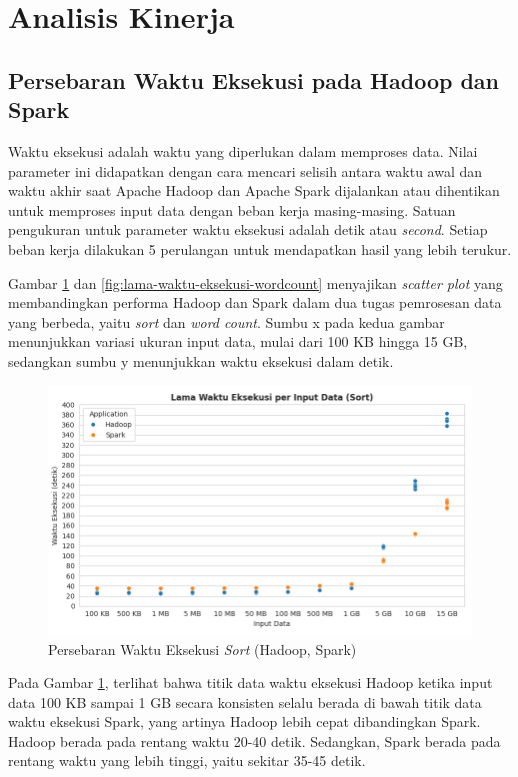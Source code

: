 \newpage
\section {Analisis Kinerja}
\subsection{Persebaran Waktu Eksekusi pada Hadoop dan Spark}
Waktu eksekusi adalah waktu yang diperlukan dalam memproses data. Nilai parameter ini didapatkan dengan cara mencari selisih antara waktu awal dan waktu akhir saat Apache Hadoop dan Apache Spark dijalankan atau dihentikan untuk memproses input data dengan beban kerja masing-masing. Satuan pengukuran untuk parameter waktu eksekusi adalah detik atau \textit{second}. Setiap beban kerja dilakukan 5 perulangan untuk mendapatkan hasil yang lebih terukur. 

Gambar \ref{fig:lama-waktu-eksekusi-sort} dan \ref{fig:lama-waktu-eksekusi-wordcount} menyajikan \textit{scatter plot} yang membandingkan performa Hadoop dan Spark dalam dua tugas pemrosesan data yang berbeda, yaitu \textit{sort} dan \textit{word count}.  Sumbu x pada kedua gambar menunjukkan variasi ukuran input data, mulai dari 100 KB hingga 15 GB, sedangkan sumbu y menunjukkan waktu eksekusi dalam detik.

\begin{figure}[h]
    \centering
    \includegraphics[width=1\textwidth]{figures/ch04/1-lama-waktu-eksekusi-sort.png}
    \caption{Persebaran Waktu Eksekusi \textit{Sort} (Hadoop, Spark)}
    \label{fig:lama-waktu-eksekusi-sort}
\end{figure}

Pada Gambar \ref{fig:lama-waktu-eksekusi-sort}, terlihat bahwa titik data waktu eksekusi Hadoop ketika input data 100 KB sampai 1 GB secara konsisten selalu berada di bawah titik data waktu eksekusi Spark, yang artinya Hadoop lebih cepat dibandingkan Spark. Hadoop berada pada rentang waktu 20-40 detik. Sedangkan, Spark berada pada rentang waktu yang lebih tinggi, yaitu sekitar 35-45 detik. 


